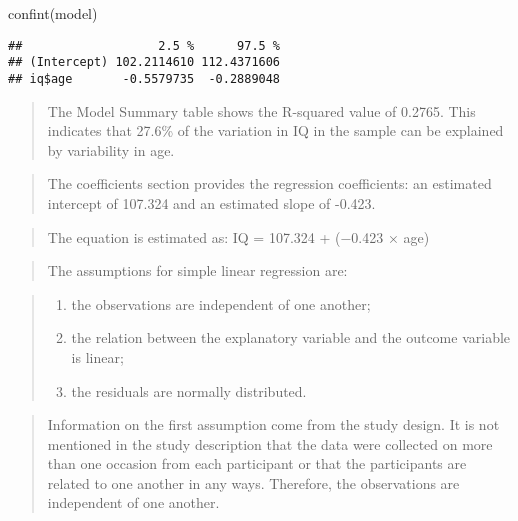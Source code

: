 \documentclass[
]{memoir}
\newenvironment{Shaded}{\begin{snugshade}}{\end{snugshade}}
\newcommand{\FunctionTok}[1]{\textcolor[rgb]{0.00,0.00,0.00}{#1}}
\newcommand{\NormalTok}[1]{#1}
\providecommand{\tightlist}{%
  \setlength{\itemsep}{0pt}\setlength{\parskip}{0pt}}
\begin{document}
\begin{Shaded}
\begin{Highlighting}[]
\FunctionTok{confint}\NormalTok{(model)}
\end{Highlighting}
\end{Shaded}

\begin{verbatim}
##                   2.5 %      97.5 %
## (Intercept) 102.2114610 112.4371606
## iq$age       -0.5579735  -0.2889048
\end{verbatim}

\begin{quote}
The Model Summary table shows the R-squared value of 0.2765. This indicates that 27.6\% of the variation in IQ in the sample can be explained by variability in age.
\end{quote}

\begin{quote}
The coefficients section provides the regression coefficients: an estimated intercept of 107.324 and an estimated slope of -0.423.
\end{quote}

\begin{quote}
The equation is estimated as: IQ = 107.324 + (−0.423 × age)
\end{quote}

\begin{quote}
The assumptions for simple linear regression are:
\end{quote}

\begin{quote}
\begin{enumerate}
\def\labelenumi{\arabic{enumi}.}
\tightlist
\item
  the observations are independent of one another;
\item
  the relation between the explanatory variable and the outcome variable is linear;
\item
  the residuals are normally distributed.
\end{enumerate}
\end{quote}

\begin{quote}
Information on the first assumption come from the study design. It is not mentioned in the study description that the data were collected on more than one occasion from each participant or that the participants are related to one another in any ways. Therefore, the observations are independent of one another.
\end{quote}
\end{document}
